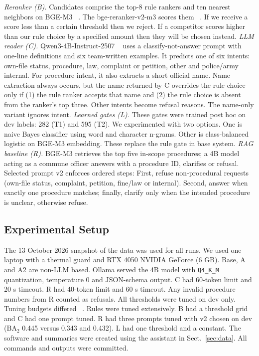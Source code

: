 \documentclass[runningheads]{llncs}
\newcommand{\BA}{\ensuremath{\mathrm{BA}_2}}
\begin{document}
\emph{Reranker (B).}
{Candidates comprise the top-8 rule rankers and ten nearest neighbors on BGE-M3 ~\cite{chen2024m3}. The bge-reranker-v2-m3 scores them ~\cite{bgererank}. If we receive a score less than a certain threshold then we reject. If a competitor scores higher than our rule choice by a specified amount then they will be chosen instead.}
\emph{LLM reader (C).}
{Qwen3-4B-Instruct-2507 ~\cite{qwen3inst} uses a classify-not-answer prompt with one-line definitions and six team-written examples. It predicts one of six intents: own-file status, procedure, law, complaint or petition, other and police/army internal. For procedure intent, it also extracts a short official name. Name extraction always occurs, but the name returned by C overrides the rule choice only if (1) the rule ranker accepts that name and (2) the rule choice is absent from the ranker's top three. Other intents become refusal reasons. The name-only variant ignores intent.}
\emph{Learned gates (L).}
{These gates were trained post hoc on dev labels: 282 (T1) and 595 (T2). We experimented with two options. One is naive Bayes classifier using word and character n-grams. Other is class-balanced logistic on BGE-M3 embedding. These replace the rule gate in base system.}
\emph{RAG baseline (R).}
{BGE-M3 retrieves the top five in-scope procedures; a 4B model acting as a commune officer answers with a procedure ID, clarifies or refusal. Selected prompt v2 enforces ordered steps: First, refuse non-procedural requests (own-file status, complaint, petition, fine/law or internal). Second, answer when exactly one procedure matches; finally, clarify only when the intended procedure is unclear, otherwise refuse.}

\subsection{Experimental Setup}\label{sec:setup}

{The 13 October 2026 snapshot of the data was used for all runs. We used one laptop with a thermal guard and RTX 4050 NVIDIA GeForce (6 GB). Base, A and A2 are non-LLM based. Ollama served the 4B model with \texttt{Q4\_K\_M} quantization, temperature 0 and JSON-schema output. C had 60-token limit and 20 s timeout. R had 40-token limit and 60 s timeout. Any invalid procedure numbers from R counted as refusals. All thresholds were tuned on dev only. Tuning budgets differed ~\cite{dodge2019}. Rules were tuned extensively. B had a threshold grid and C had one prompt tuned. R had three prompts tuned with v2 chosen on dev (\BA{} 0.445 versus 0.343 and 0.432). L had one threshold and a constant. The software and summaries were created using the assistant in Sect.~\ref{sec:data}. All commands and outputs were committed.}
\end{document}
